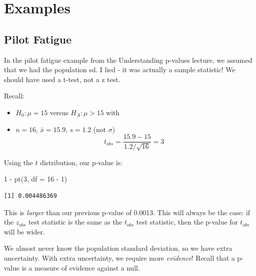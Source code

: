 \documentclass[
  letterpaper,
  DIV=11,
  numbers=noendperiod,
  oneside]{scrreprt}
\newenvironment{Shaded}{\begin{snugshade}}{\end{snugshade}}
\newcommand{\AttributeTok}[1]{\textcolor[rgb]{0.40,0.45,0.13}{#1}}
\newcommand{\DecValTok}[1]{\textcolor[rgb]{0.68,0.00,0.00}{#1}}
\newcommand{\FunctionTok}[1]{\textcolor[rgb]{0.28,0.35,0.67}{#1}}
\newcommand{\NormalTok}[1]{\textcolor[rgb]{0.00,0.23,0.31}{#1}}
\newcommand{\SpecialCharTok}[1]{\textcolor[rgb]{0.37,0.37,0.37}{#1}}
\providecommand{\tightlist}{%
  \setlength{\itemsep}{0pt}\setlength{\parskip}{0pt}}\usepackage{longtable,booktabs,array}
\begin{document}
\hypertarget{examples-6}{%
\section{Examples}\label{examples-6}}

\hypertarget{pilot-fatigue}{%
\subsection{Pilot Fatigue}\label{pilot-fatigue}}

In the pilot fatigue example from the Understanding p-values lecture, we
assumed that we had the population sd. I lied - it was actually a sample
statistic! We should have used a t-test, not a z test.

Recall:

\begin{itemize}
\tightlist
\item
  \(H_0: \mu = 15\) versus \(H_A: \mu > 15\) with
\item
  \(n = 16\), \(\bar x = 15.9\), \(s = 1.2\) (not \(\sigma\)) \[
  t_{obs} = \frac{15.9 - 15}{1.2/\sqrt{16}} = 3
  \]
\end{itemize}

Using the \(t\) distribution, our p-value is:

\begin{Shaded}
\begin{Highlighting}[]
\DecValTok{1} \SpecialCharTok{{-}} \FunctionTok{pt}\NormalTok{(}\DecValTok{3}\NormalTok{, }\AttributeTok{df =} \DecValTok{16} \SpecialCharTok{{-}} \DecValTok{1}\NormalTok{)}
\end{Highlighting}
\end{Shaded}

\begin{verbatim}
[1] 0.004486369
\end{verbatim}

This is \emph{larger} than our previous p-value of 0.0013. This will
always be the case: if the \(z_{obs}\) test statistic is the same as the
\(t_{obs}\) test statistic, then the p-value for \(t_{obs}\) will be
wider.

\begin{tcolorbox}[enhanced jigsaw, toprule=.15mm, colbacktitle=quarto-callout-warning-color!10!white, title=\textcolor{quarto-callout-warning-color}{\faExclamationTriangle}\hspace{0.5em}{p-values from a t-test are larger than a z-test (if you have
\(\sigma=s\))}, arc=.35mm, colframe=quarto-callout-warning-color-frame, colback=white, titlerule=0mm, left=2mm, bottomtitle=1mm, bottomrule=.15mm, breakable, opacitybacktitle=0.6, leftrule=.75mm, toptitle=1mm, coltitle=black, rightrule=.15mm, opacityback=0]

We almost never know the population standard deviation, so we have extra
uncertainty. With extra uncertainty, we require more \emph{evidence}!
Recall that a p-value is a measure of evidence against a null.

\end{tcolorbox}
\end{document}
